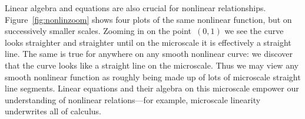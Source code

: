 Linear algebra and equations are also crucial for nonlinear relationships.
Figure~\ref{fig:nonlinzoom} shows four plots of the same nonlinear function, but on successively smaller scales.
Zooming in on the point~\((0,1)\) we see the curve looks straighter and straighter until on the microscale it is effectively a straight line.
The same is true for anywhere on any smooth nonlinear curve: we discover that the curve looks like a straight line on the microscale. 
Thus we may view any smooth nonlinear function as roughly being made up of lots of microscale straight line segments.
Linear equations and their algebra on this microscale empower our understanding of nonlinear relations---for example, microscale linearity underwrites all of calculus.
 




\endinput





